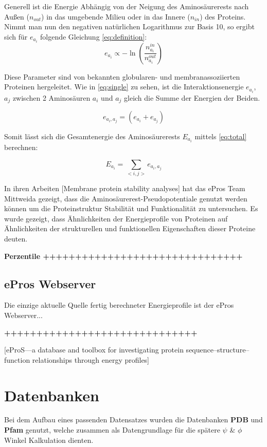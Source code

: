 Generell ist die Energie Abhängig von der Neigung des Aminosäurerests nach Außen ($n_{out}$) in das umgebende Milieu oder in das Innere ($n_{in}$) des Proteins. Nimmt man nun den negativen natürlichen Logarithmus zur Basis 10, so ergibt sich für $e_{a_i}$ folgende Gleichung \ref{eq:definition}:
%
\begin{equation}
  	e_{a_i} \propto -\ln{\left(\frac{n_{a_i}^{in}}{n_{a_i}^{out}}\right)}
  	\label{eq:definition}
\end{equation}

Diese Parameter sind von bekannten globularen- und membranassoziierten Proteinen hergeleitet. Wie in \ref{eq:single} zu sehen, ist die Interaktionsenergie $e_{a_{i}}$, $a_{j}$ zwischen 2 Aminosäuren $a_{i}$ und $a_{j}$ gleich die Summe der Energien der Beiden. 

\begin{equation}
  	e_{a_{i},a_{j}} = \left( e_{a_{i}} + e_{a_{j}} \right)
    \label{eq:single}
\end{equation}

Somit lässt sich die Gesamtenergie des Aminosäurerests $E_{a_i}$ mittels \ref{eq:total} berechnen:

\begin{equation}
    E_{a_{i}} = \sum_{< i, j >}{e_{a_{i},a_{j}}} 
    \label{eq:total}
\end{equation}

In ihren Arbeiten [Membrane protein stability analyses] hat das ePros Team Mittweida gezeigt, dass die Aminosäurerest-Pseudopotentiale genutzt werden können um die Proteinstruktur Stabilität und Funktionalität zu untersuchen. Es wurde gezeigt, dass Ähnlichkeiten der Energieprofile von Proteinen auf Ähnlichkeiten der strukturellen und funktionellen Eigenschaften dieser Proteine deuten.

\textbf{Perzentile +++++++++++++++++++++++++++++++}

\subsection{ePros Webserver}
Die einzige aktuelle Quelle fertig berechneter Energieprofile ist der ePros Webserver... 

\textbf{++++++++++++++++++++++++++++++}

[eProS—a database and toolbox for investigating protein sequence–structure–function relationships through energy profiles]


\section{Datenbanken}
Bei dem Aufbau eines passenden Datensatzes wurden die Datenbanken \textbf{PDB} und \textbf{Pfam} genutzt, welche zusammen als Datengrundlage für die spätere $\psi$ \& $\phi$ Winkel Kalkulation dienten. 


